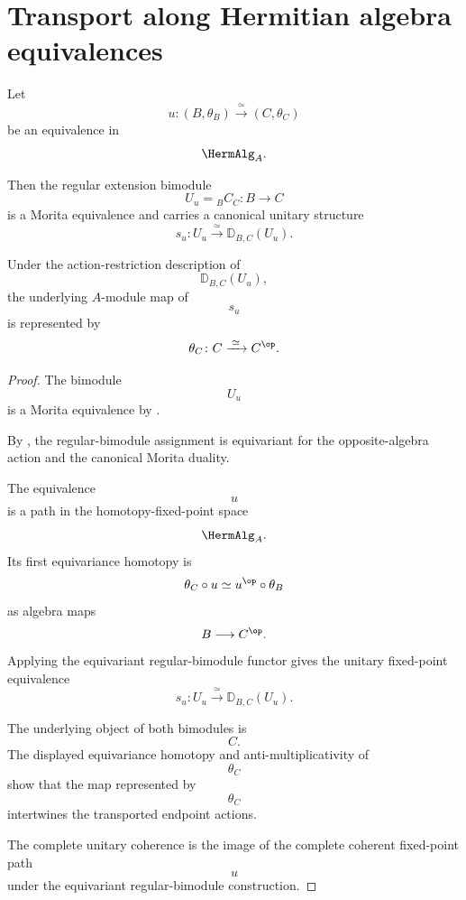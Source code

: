 \section{Transport along Hermitian algebra equivalences}
\label{sec:transport-hermitian-algebra-equivalences}

\begin{lemma}
\label{lem:hermitian-equivalence-unitary-regular}
Let
\[
    u
    \colon
    (B,\theta_B)
    \xrightarrow{\;\simeq\;}
    (C,\theta_C)
\]
be an equivalence in
\[
    \HermAlg_A.
\]

Then the regular extension bimodule
\[
    U_u
    =
    {}_B C_C
    \colon
    B
    \longrightarrow
    C
\]
is a Morita equivalence and carries a canonical unitary structure
\[
    s_u
    \colon
    U_u
    \xrightarrow{\;\simeq\;}
    \mathbb D_{B,C}(U_u).
\]

Under the action-restriction description of
\[
    \mathbb D_{B,C}(U_u),
\]
the underlying $A$-module map of
\[
    s_u
\]
is represented by
\[
    \theta_C
    \colon
    C
    \xrightarrow{\;\simeq\;}
    C^{\op}.
\]
\end{lemma}

\begin{proof}
The bimodule
\[
    U_u
\]
is a Morita equivalence by
.

By
,
the regular-bimodule assignment is equivariant for the
opposite-algebra action and the canonical Morita duality.

The equivalence
\[
    u
\]
is a path in the homotopy-fixed-point space
\[
    \HermAlg_A.
\]
Its first equivariance homotopy is
\[
    \theta_C\circ u
    \simeq
    u^{\op}\circ\theta_B
\]
as algebra maps
\[
    B
    \longrightarrow
    C^{\op}.
\]
Applying the equivariant regular-bimodule functor gives the unitary
fixed-point equivalence
\[
    s_u
    \colon
    U_u
    \xrightarrow{\;\simeq\;}
    \mathbb D_{B,C}(U_u).
\]

The underlying object of both bimodules is
\[
    C.
\]
The displayed equivariance homotopy and anti-multiplicativity of
\[
    \theta_C
\]
show that the map represented by
\[
    \theta_C
\]
intertwines the transported endpoint actions.

The complete unitary coherence is the image of the complete coherent
fixed-point path
\[
    u
\]
under the equivariant regular-bimodule construction.
\end{proof}

